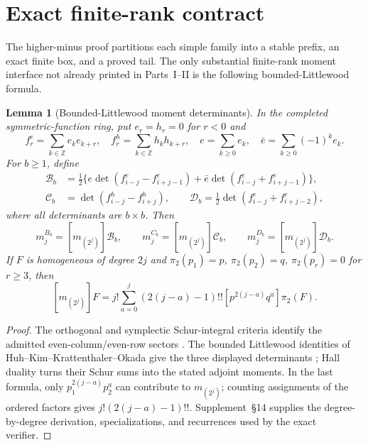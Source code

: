 \documentclass[10pt,reqno]{amsart}
\newtheorem{lemma}[theorem]{Lemma}
\theoremstyle{definition}
\begin{document}
\section{Exact finite-rank contract}

The higher-minus proof partitions each simple family into a stable prefix,
an exact finite box, and a proved tail.  The only substantial finite-rank
moment interface not already printed in Parts~I--II is the following
bounded-Littlewood formula.

\begin{lemma}[Bounded-Littlewood moment determinants]
\label{lem:bl}
In the completed symmetric-function ring, put $e_r=h_r=0$ for $r<0$ and
\[
 f_r^e=\sum_{k\in\mathbb Z}e_ke_{k+r},\quad
 f_r^h=\sum_{k\in\mathbb Z}h_kh_{k+r},\quad
 e=\sum_{k\geq0}e_k,\quad \bar e=\sum_{k\geq0}(-1)^ke_k.
\]
For $b\geq1$, define
\[
\begin{aligned}
 \mathcal B_b&=\tfrac12\{e\det(f^e_{i-j}-f^e_{i+j-1})
 +\bar e\det(f^e_{i-j}+f^e_{i+j-1})\},\\
 \mathcal C_b&=\det(f^h_{i-j}-f^h_{i+j}),\qquad
 \mathcal D_b=\tfrac12\det(f^e_{i-j}+f^e_{i+j-2}),
\end{aligned}
\]
where all determinants are $b\times b$.  Then
\[
 m_j^{B_b}=[m_{(2^j)}]\mathcal B_b,\qquad
 m_j^{C_b}=[m_{(2^j)}]\mathcal C_b,\qquad
 m_j^{D_b}=[m_{(2^j)}]\mathcal D_b.
\]
If $F$ is homogeneous of degree $2j$ and
$\pi_2(p_1)=p$, $\pi_2(p_2)=q$, $\pi_2(p_r)=0$ for $r\geq3$, then
\[
 [m_{(2^j)}]F=j!\sum_{a=0}^{j}(2(j-a)-1)!!
 [p^{2(j-a)}q^a]\pi_2(F).
\]
\end{lemma}

\begin{proof}
The orthogonal and symplectic Schur-integral criteria identify the admitted
even-column/even-row sectors \cite{Rains1997}.  The bounded Littlewood
identities of Huh--Kim--Krattenthaler--Okada give the three displayed
determinants \cite{HKKO2025}; Hall duality turns their Schur sums into the
stated adjoint moments.  In the last formula, only
$p_1^{2(j-a)}p_2^a$ can contribute to $m_{(2^j)}$; counting assignments of
the ordered factors gives $j!(2(j-a)-1)!!$.  Supplement~\S14 supplies the
degree-by-degree derivation, specializations, and recurrences used by the
exact verifier.
\end{proof}
\end{document}
